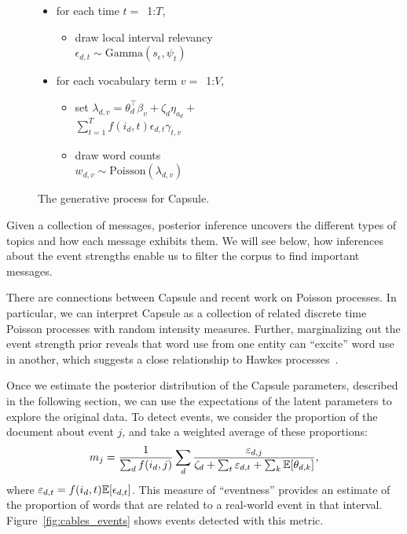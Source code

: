 \begin{figure}[!ht]
\begin{mdframed}[userdefinedwidth=3.0in,align=center]
\begin{itemize}[leftmargin=*]
\begin{itemize}[leftmargin=*]
\begin{itemize}[leftmargin=*]
		\end{itemize}
	\item for each time $t=$~1:$T$,
		\begin{itemize}[leftmargin=*]
			\item draw local interval relevancy \\$\epsilon_{d,t} \sim \mbox{Gamma}(s_\epsilon, \psi_{t})$
		\end{itemize}
	\item for each vocabulary term $v=$~1:$V$,
		\begin{itemize}[leftmargin=*]
			\item set $\lambda_{d,v} = \theta_d^\top\beta_v  + \zeta_d \eta_{a_d} +$\\$ \sum_{t=1}^T f(i_d, t) \epsilon_{d,t} \gamma_{t,v}$
			\item draw word counts \\$w_{d,v} \sim \mbox{Poisson}\left(\lambda_{d,v}\right)$
		\end{itemize}
	\end{itemize}
\end{itemize}
\end{mdframed}
\caption{The generative process for Capsule.}
\label{fig:generative-model}
\end{figure}

Given a collection of messages, posterior inference uncovers the
different types of topics and how each message exhibits them. We will
see below, how inferences about the event strengths enable us to
filter the corpus to find important messages.

There are connections between Capsule and recent work on Poisson
processes. In particular, we can interpret Capsule as a collection of
related discrete time Poisson processes with random intensity
measures. Further, marginalizing out the event strength prior reveals
that word use from one entity can ``excite'' word use in another, which
suggests a close relationship to Hawkes processes~\cite{hawkes1971spectra}.


Once we estimate the posterior distribution of the Capsule parameters, described in the following section, we can use the expectations of the latent parameters to explore the original data.  To detect events, we consider the proportion of the document about event $j$, and take a weighted average of these proportions:
\begin{equation*}
m_j = \frac{1}{\sum_{d} f(i_d, j)} \sum_{d}\frac{\varepsilon_{d,j}}{\zeta_d + \sum_{t} \varepsilon_{d,t} + \sum_{k} \mathbb{E}[\theta_{d,k}] },
\label{eq:eventness}
\end{equation*}
where $\varepsilon_{d,t} = f(i_d, t) \mathbb{E}[\epsilon_{d,t}]$.
This measure of ``eventness'' provides an estimate of the proportion of words that are related to a real-world event in that interval.  Figure~\ref{fig:cables_events} shows events detected with this metric.

